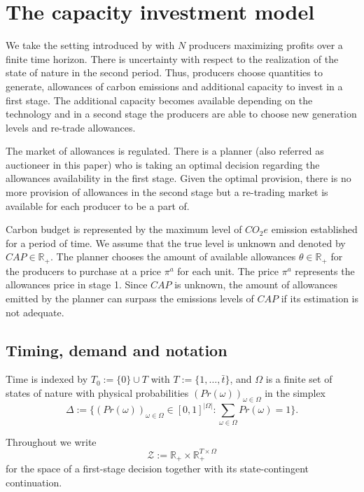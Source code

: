 \documentclass[a4paper,fleqn]{cas-dc}
\begin{document}
\section{The capacity investment model}\label{sec:model}


We take the setting introduced by \cite{amigo_two_2021} with $N$ producers maximizing profits over a finite time horizon. There is uncertainty with respect to the realization of the state of nature in the second period. Thus, producers choose quantities to generate, allowances of carbon emissions and additional capacity to invest in a first stage. The additional capacity becomes available depending on the technology and in a second stage the producers are able to choose new generation levels and re-trade allowances.

The market of allowances is regulated. There is a planner (also referred as auctioneer in this paper) who is taking an optimal decision regarding the allowances availability in the first stage.  Given the optimal provision, there is no more provision of allowances in the second stage but a re-trading market is available for each producer to be a part of.

Carbon budget is represented by the maximum level of $CO_2e$ emission established for a period of time. We assume that the true level is unknown and denoted by $CAP\in\mathbb{R}_+$. The planner chooses the amount of available allowances $\theta\in\mathbb{R}_+$ for the producers to purchase at a price $\pi^a$ for each unit. The price $\pi^a$ represents the allowances price in stage 1. Since $CAP$ is unknown, the amount of allowances emitted by the planner can surpass the emissions levels of $CAP$ if its estimation is not adequate.

\subsection{Timing, demand and notation}\label{subsec:demand}

Time is indexed by $T_0:=\{0\}\cup T$ with $T:=\{1,\dots,\bar t\}$, and $\Omega$ is a finite set of states of nature with physical probabilities $(Pr(\omega))_{\omega\in\Omega}$ in the simplex
\[
\Delta:=\Big\{(Pr(\omega))_{\omega\in\Omega}\in[0,1]^{|\Omega|}:\textstyle\sum_{\omega\in\Omega}Pr(\omega)=1\Big\}.
\]

Throughout we write
\[
\mathcal{Z}:=\mathbb{R}_+\times\mathbb{R}_+^{T\times\Omega}
\]
for the space of a first-stage decision together with its state-contingent continuation.
\end{document}
